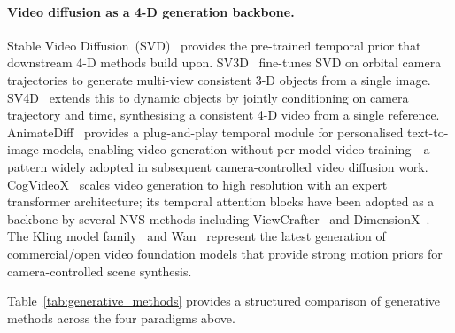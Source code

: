 \paragraph{Video diffusion as a 4-D generation backbone.}
Stable Video Diffusion~(SVD)~\citep{blattmann2023svd} provides the
pre-trained temporal prior that downstream 4-D methods build upon.
SV3D~\citep{voleti2024sv3d} fine-tunes SVD on orbital camera trajectories
to generate multi-view consistent 3-D objects from a single image.
SV4D~\citep{xie2024sv4d} extends this to dynamic objects by jointly conditioning
on camera trajectory and time, synthesising a consistent 4-D video from
a single reference.
AnimateDiff~\citep{guo2023animatediff} provides a plug-and-play temporal
module for personalised text-to-image models, enabling video generation
without per-model video training---a pattern widely adopted in subsequent
camera-controlled video diffusion work.
CogVideoX~\citep{yang2024cogvideox} scales video generation to high resolution
with an expert transformer architecture; its temporal attention blocks have
been adopted as a backbone by several NVS methods including
ViewCrafter~\citep{yu2024viewcrafter} and DimensionX~\citep{sun2024dimensionx}.
The Kling model family~\citep{kling2025report} and
Wan~\citep{wan2025wan} represent the latest generation of
commercial/open video foundation models that provide strong motion priors
for camera-controlled scene synthesis.

Table~\ref{tab:generative_methods} provides a structured comparison of generative
\nvs{} methods across the four paradigms above.

